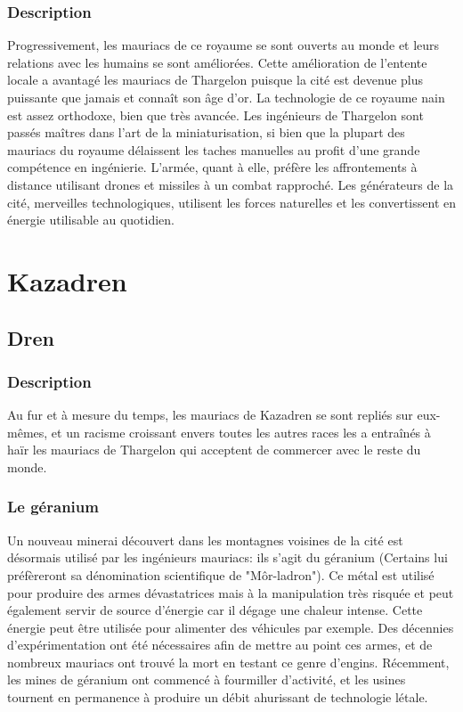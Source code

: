 \subsubsection{Description}
Progressivement, les mauriacs de ce royaume se sont ouverts au monde et leurs relations avec les humains se sont améliorées. Cette amélioration de l'entente locale a avantagé les mauriacs de Thargelon puisque la cité est devenue plus puissante que jamais et connaît son âge d'or.
\newline
La technologie de ce royaume nain est assez orthodoxe, bien que très avancée. Les ingénieurs de Thargelon sont passés maîtres dans l'art de la miniaturisation, si bien que la plupart des mauriacs du royaume délaissent les taches manuelles au profit d'une grande compétence en ingénierie. L'armée, quant à elle, préfère les affrontements à distance utilisant drones et missiles à un combat rapproché. Les générateurs de la cité, merveilles technologiques, utilisent les forces naturelles et les convertissent en énergie utilisable au quotidien.
\section{Kazadren}
\subsection{Dren}
\subsubsection{Description}
Au fur et à mesure du temps, les mauriacs de Kazadren se sont repliés sur eux-mêmes, et un racisme croissant envers toutes les autres races les a entraînés à haïr les mauriacs de Thargelon qui acceptent de commercer avec le reste du monde.
\subsubsection{Le géranium}
Un nouveau minerai découvert dans les montagnes voisines de la cité est désormais utilisé par les ingénieurs mauriacs: ils s'agit du géranium (Certains lui préfèreront sa dénomination scientifique de "Môr-ladron"). Ce métal est utilisé pour produire des armes dévastatrices mais à la manipulation très risquée et peut également servir de source d'énergie car il dégage une chaleur intense. Cette énergie peut être utilisée pour alimenter des véhicules par exemple. Des décennies d'expérimentation ont été nécessaires afin de mettre au point ces armes, et de nombreux mauriacs ont trouvé la mort en testant ce genre d'engins. Récemment, les mines de géranium ont commencé à fourmiller d'activité, et les usines tournent en permanence à produire un débit ahurissant de technologie létale.
